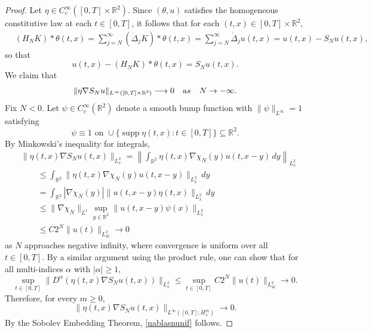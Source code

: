 \documentclass[11pt,reqno,xcolor=svgnames]{amsart}
\def\R{{\mathbb R}}
\theoremstyle{plain}
\theoremstyle{definition}
\theoremstyle{plain}
\theoremstyle{remark}
\newcommand{\abs}[1]{\left\vert#1\right\vert}
\DeclareMathOperator{\supp}{supp}
\begin{document}
\begin{proof}
Let $\eta\in C^{\infty}_c([0,T]\times \R^2)$.  Since $(\theta,u)$ satisfies the homogeneous constitutive law at each $t\in [0,T]$, it follows that for each $(t,x)\in [0,T]\times\R^2$,
\begin{equation}\label{constlawapp}
\begin{split}
&(H_NK) \ast \theta(t,x) = \sum_{j= N}^{\infty} (\dot{\Delta}_jK)\ast \theta(t,x) = \sum_{j= N}^{\infty} \dot{\Delta}_j u(t,x) = u(t,x) - S_N u(t,x),
\end{split}
\end{equation}
so that $$u(t,x) - (H_NK) \ast \theta(t,x)  = S_Nu(t,x).$$
We claim that 
\begin{equation}\label{nablasnunif}
\|\eta\nabla S_Nu \|_{L^{\infty}([0,T]\times\R^2)}  \longrightarrow 0 \quad {\text  as } \quad N\rightarrow-\infty.
\end{equation}
Fix $N<0$.  Let $\psi\in C^{\infty}_c(\R^2)$ denote a smooth bump function with $\|\psi \|_{L^{\infty}} = 1$ satisfying 
$$\psi \equiv 1 \text{ on } \cup\{ \supp \eta(t,x): t\in [0,T]\}\subseteq\R^2. $$  By Minkowski's inequality for integrals,
\begin{equation}\label{nablasntozero}
\begin{split}
&\|\eta(t,x)\nabla S_Nu (t, x) \|_{L^2_x}  = \left \|  \int_{\R^2} \eta(t,x) \nabla \chi_N(y) u(t,x-y) \, dy   \right \|_{L^2_x}\\
&\qquad \leq  \int_{\R^2} \| \eta(t,x) \nabla \chi_N(y) u(t,x-y) \|_{L^2_x} \, dy  \\
&\qquad = \int_{\R^2} \abs{\nabla\chi_N(y)} \| u(t, x-y)\eta(t, x) \|_{L^2_x} \, dy\\
&\qquad \leq \| \nabla\chi_N\|_{L^{1}} \sup_{y\in\R^2}\| u(t, x-y)\psi(x) \|_{L^2_x}\\ 
&\qquad \leq C2^N\| u(t) \|_{L^2_{ul}} \longrightarrow 0
\end{split}
\end{equation}
as $N$ approaches negative infinity, where convergence is uniform over all $t\in [0,T]$.  By a similar argument using the product rule, one can show that for all multi-indices $\alpha$ with $|\alpha| \geq 1$,
\begin{equation}\label{dernablasnuHmconv} \sup_{t\in [0,T]}\|D^{\alpha}(\eta(t,x)\nabla S_Nu (t, x) )\|_{L^2_x}  \leq \sup_{t\in [0,T]} C2^N\| u(t) \|_{L^2_{ul}} \longrightarrow 0. 
\end{equation}
Therefore, for every $m\geq 0$,
\begin{equation}\label{nablasnuHmconv}\|\eta(t,x)\nabla S_Nu (t, x) \|_{L^{\infty}([0,T];H^m_x)}  \longrightarrow 0.
\end{equation}
By the Sobolev Embedding Theorem, \cref{nablasnunif} follows.  


\end{proof}
\end{document}
